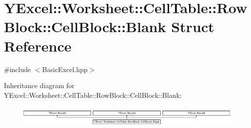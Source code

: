 \hypertarget{struct_y_excel_1_1_worksheet_1_1_cell_table_1_1_row_block_1_1_cell_block_1_1_blank}{}\section{Y\+Excel\+:\+:Worksheet\+:\+:Cell\+Table\+:\+:Row\+Block\+:\+:Cell\+Block\+:\+:Blank Struct Reference}
\label{struct_y_excel_1_1_worksheet_1_1_cell_table_1_1_row_block_1_1_cell_block_1_1_blank}


{\ttfamily \#include $<$Basic\+Excel.\+hpp$>$}

Inheritance diagram for Y\+Excel\+:\+:Worksheet\+:\+:Cell\+Table\+:\+:Row\+Block\+:\+:Cell\+Block\+:\+:Blank\+:\begin{figure}[H]
\begin{center}
\leavevmode
\includegraphics[height=1.094819cm]{struct_y_excel_1_1_worksheet_1_1_cell_table_1_1_row_block_1_1_cell_block_1_1_blank}
\end{center}
\end{figure}
